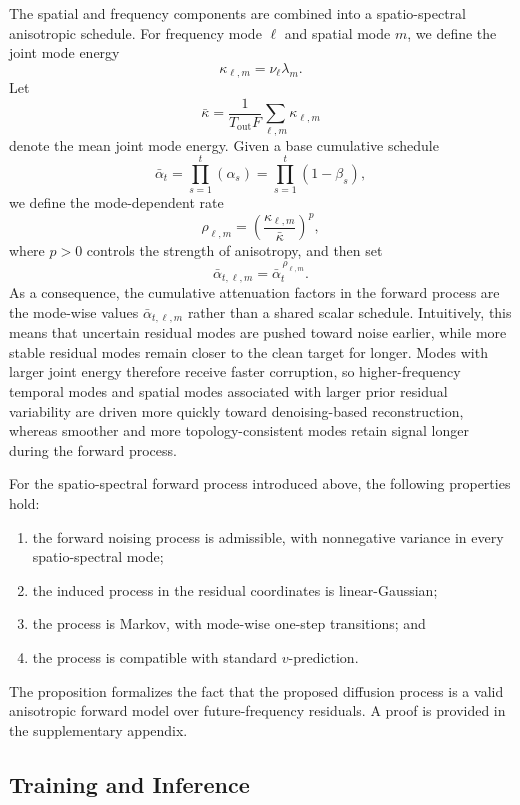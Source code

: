 \documentclass[runningheads]{llncs}
\begin{document}
The spatial and frequency components are combined into a spatio-spectral anisotropic schedule. For frequency mode $\ell$ and spatial mode $m$, we define the joint mode energy
\[
\kappa_{\ell,m} = \nu_\ell \lambda_m.
\]
Let
\[
\bar{\kappa}
=
\frac{1}{T_{\mathrm{out}}F}\sum_{\ell,m}\kappa_{\ell,m}
\]
denote the mean joint mode energy. Given a base cumulative schedule
\[
\bar{\alpha}_t = \prod_{s=1}^{t}(\alpha_s) = \prod_{s=1}^{t}(1-\beta_s),
\]
we define the mode-dependent rate
\[
\rho_{\ell,m}
=
\left(\frac{\kappa_{\ell,m}}{\bar{\kappa}}\right)^p,
\]
where $p>0$ controls the strength of anisotropy, and then set
\[
\bar{\alpha}_{t,\ell,m} = \bar{\alpha}_t^{\,\rho_{\ell,m}}.
\]
As a consequence, the cumulative attenuation factors in the forward process are the mode-wise values $\bar{\alpha}_{t,\ell,m}$ rather than a shared scalar schedule. Intuitively, this means that uncertain residual modes are pushed toward noise earlier, while more stable residual modes remain closer to the clean target for longer. Modes with larger joint energy therefore receive faster corruption, so higher-frequency temporal modes and spatial modes associated with larger prior residual variability are driven more quickly toward denoising-based reconstruction, whereas smoother and more topology-consistent modes retain signal longer during the forward process.


\begin{proposition}
\label{prop:ss_validity}
For the spatio-spectral forward process introduced above, the following properties hold:
\begin{enumerate}
    \item the forward noising process is admissible, with nonnegative variance in every spatio-spectral mode;
    \item the induced process in the residual coordinates is linear-Gaussian;
    \item the process is Markov, with mode-wise one-step transitions; and
    \item the process is compatible with standard $v$-prediction.
\end{enumerate}
\end{proposition}

The proposition formalizes the fact that the proposed diffusion process is a valid anisotropic forward model over future-frequency residuals. A proof is provided in the supplementary appendix.

\subsection{Training and Inference}
\label{sec:method_training}
\end{document}
